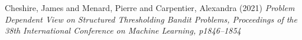 \documentclass[
	landscape, %
]{ImperialPoster}
\begin{document}
\begin{multicols}{4}

 

	\begin{thebibliography}{5}
		Cheshire, James and Menard, Pierre and Carpentier, Alexandra (2021) \emph{Problem Dependent View on Structured Thresholding Bandit Problems, Proceedings of the 38th International Conference on Machine Learning, p1846--1854}
		\end{thebibliography}
\end{multicols}





	
	
	
	
	
\end{document}
